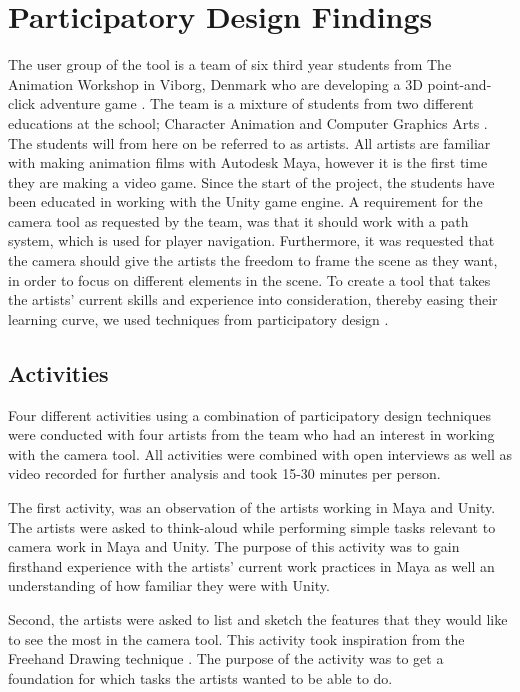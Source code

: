 \section{Participatory Design Findings}
The user group of the tool is a team of six third year students from The Animation Workshop in Viborg, Denmark who are developing a 3D point-and-click adventure game \cite{adventure_genre}.  The team is a mixture of students from two different educations at the school; Character Animation and Computer Graphics Arts \cite{taw_degrees}. The students will from here on be referred to as artists.
All artists are familiar with making animation films with Autodesk Maya, however it is the first time they are making a video game. Since the start of the project, the students have been educated in working with the Unity game engine.
A requirement for the camera tool as requested by the team, was that it should work with a path system, which is used for player navigation. Furthermore, it was requested that the camera should give the artists the freedom to frame the scene as they want, in order to focus on different elements in the scene.
To create a tool that takes the artists' current skills and experience into consideration, thereby easing their learning curve, we used techniques from participatory design \cite{part_design}.

\subsection{Activities}
Four different activities using a combination of participatory design techniques were conducted with four artists from the team who had an interest in working with the camera tool. All activities were combined with open interviews as well as video recorded for further analysis and took 15-30 minutes per person.

The first activity, was an observation \cite{part_design} of the artists working in Maya and Unity. The artists were asked to think-aloud \cite{part_design} while performing simple tasks relevant to camera work in Maya and Unity. The purpose of this activity was to gain firsthand experience with the artists' current work practices in Maya as well an understanding of how familiar they were with Unity.

Second, the artists were asked to list and sketch the features that they would like to see the most in the camera tool. This activity took inspiration from the Freehand Drawing technique \cite{part_design}. The purpose of the activity was to get a foundation for which tasks the artists wanted to be able to do.

